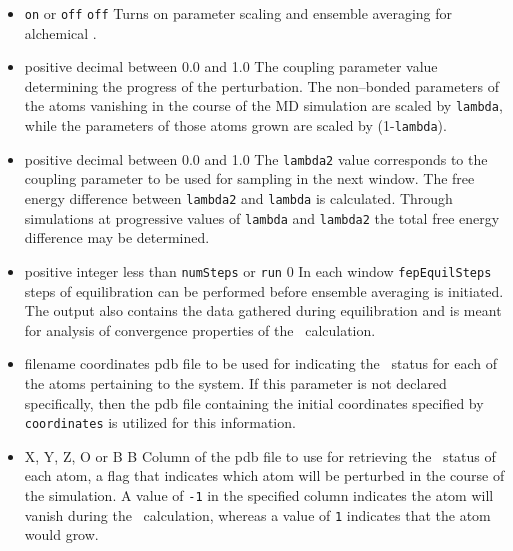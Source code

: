 \begin{itemize}

\item
{}
{{\tt on} or {\tt off}}
{{\tt off}}
{Turns on parameter scaling and ensemble averaging for alchemical \FEP.}

\item
{}
{positive decimal between 0.0 and 1.0}
{The coupling parameter value determining the progress of the
perturbation. The non--bonded parameters of the atoms vanishing
in the course of the MD simulation are scaled by {\tt lambda}, while
the parameters of those atoms grown are scaled by (1-{\tt lambda}).}

\item
{}
{positive decimal between 0.0 and 1.0}
{The {\tt lambda2} value corresponds to the coupling parameter to be
used for sampling in the next window.  The free energy difference
between {\tt lambda2} and {\tt lambda} is calculated.  Through simulations
at progressive values of {\tt lambda} and {\tt lambda2} the total free
energy difference may be determined.}

\item
{}
{positive integer less than {\tt numSteps} or {\tt run}}
{0}
{In each window {\tt fepEquilSteps} steps of equilibration can be
performed before ensemble averaging is initiated. The output also contains
the data gathered during equilibration and is meant for analysis of
convergence properties of the \FEP\ calculation.}

\item
{}
{filename}
{coordinates}
{pdb file to be used for indicating the \FEP\ status for each of
the atoms pertaining to the system. 
If this parameter is not declared specifically, then the
pdb file containing the initial coordinates specified by
{\tt coordinates} is utilized for this information.}

\item
{}
{X, Y, Z, O or B}
{B}
{Column of the pdb file to use for retrieving the \FEP\ status 
of each atom, \ie a flag that indicates which atom will be perturbed
in the course of the simulation.
A value of {\tt -1} in the specified column indicates the atom will
vanish during the \FEP\ calculation, whereas a value of {\tt 1} 
indicates that the atom would grow.}


\end{itemize}
